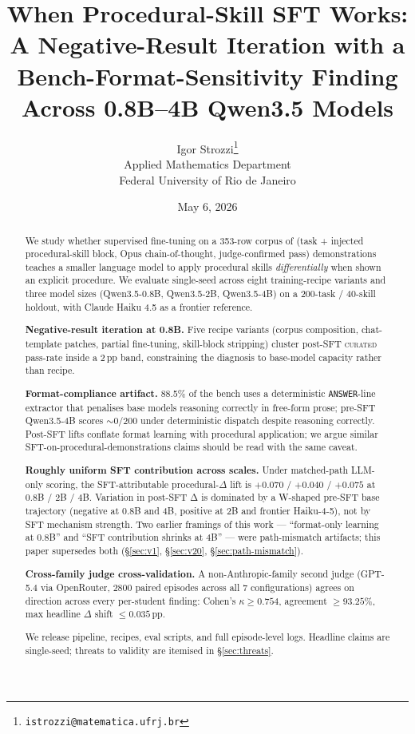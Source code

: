 \documentclass[10pt]{article}
\title{\Large\bfseries When Procedural-Skill SFT Works:\\
  A Negative-Result Iteration with a Bench-Format-Sensitivity Finding\\
  Across 0.8B--4B Qwen3.5 Models}
\author{Igor Strozzi\thanks{\texttt{istrozzi@matematica.ufrj.br}}\\
  Applied Mathematics Department\\
  Federal University of Rio de Janeiro}
\date{May 6, 2026}
\newcommand{\CU}{\textsc{curated}\xspace}
\newcommand{\Qweno}{Qwen3.5-0.8B\xspace}
\newcommand{\Qwent}{Qwen3.5-2B\xspace}
\newcommand{\Qwenf}{Qwen3.5-4B\xspace}
\begin{document}
\maketitle

\begin{abstract}
We study whether supervised fine-tuning on a 353-row corpus of (task + injected procedural-skill block, Opus chain-of-thought, judge-confirmed pass) demonstrations teaches a smaller language model to apply procedural skills \emph{differentially} when shown an explicit procedure. We evaluate single-seed across eight training-recipe variants and three model sizes (\Qweno, \Qwent, \Qwenf) on a 200-task / 40-skill holdout, with Claude Haiku 4.5 as a frontier reference.

\textbf{Negative-result iteration at 0.8B.} Five recipe variants (corpus composition, chat-template patches, partial fine-tuning, skill-block stripping) cluster post-SFT \CU{} pass-rate inside a 2\,pp band, constraining the diagnosis to base-model capacity rather than recipe.

\textbf{Format-compliance artifact.} 88.5\% of the bench uses a deterministic \texttt{ANSWER}-line extractor that penalises base models reasoning correctly in free-form prose; pre-SFT \Qwenf{} scores $\sim\!0/200$ under deterministic dispatch despite reasoning correctly. Post-SFT lifts conflate format learning with procedural application; we argue similar SFT-on-procedural-demonstrations claims should be read with the same caveat.

\textbf{Roughly uniform SFT contribution across scales.} Under matched-path LLM-only scoring, the SFT-attributable procedural-$\Delta$ lift is $+0.070$ / $+0.040$ / $+0.075$ at 0.8B / 2B / 4B. Variation in post-SFT Δ is dominated by a W-shaped pre-SFT base trajectory (negative at 0.8B and 4B, positive at 2B and frontier Haiku-4-5), not by SFT mechanism strength. Two earlier framings of this work --- ``format-only learning at 0.8B'' and ``SFT contribution shrinks at 4B'' --- were path-mismatch artifacts; this paper supersedes both (\S\ref{sec:v1}, \S\ref{sec:v20}, \S\ref{sec:path-mismatch}).

\textbf{Cross-family judge cross-validation.} A non-Anthropic-family second judge (GPT-5.4 via OpenRouter, 2800 paired episodes across all 7 configurations) agrees on direction across every per-student finding: Cohen's $\kappa \geq 0.754$, agreement $\geq 93.25\%$, max headline $\Delta$ shift $\leq 0.035$\,pp.

We release pipeline, recipes, eval scripts, and full episode-level logs. Headline claims are single-seed; threats to validity are itemised in \S\ref{sec:threats}.
\end{abstract}
\end{document}
